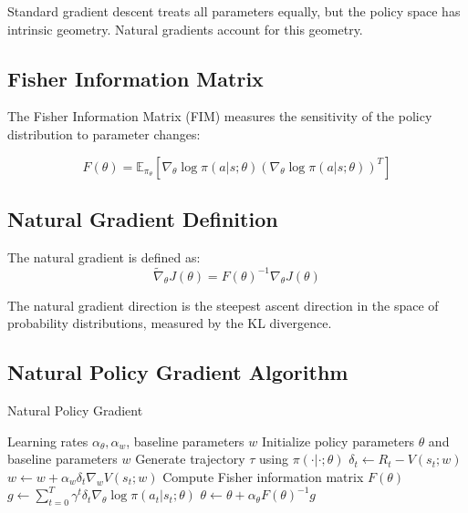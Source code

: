 Standard gradient descent treats all parameters equally, but the policy space has intrinsic geometry. Natural gradients account for this geometry.

\subsection{Fisher Information Matrix}

The Fisher Information Matrix (FIM) measures the sensitivity of the policy distribution to parameter changes:

\begin{equation}
F(\theta) = \mathbb{E}_{\pi_\theta} \left[ \nabla_\theta \log \pi(a|s; \theta) (\nabla_\theta \log \pi(a|s; \theta))^T \right]
\end{equation}

\subsection{Natural Gradient Definition}

The natural gradient is defined as:
\begin{equation}
\tilde{\nabla}_\theta J(\theta) = F(\theta)^{-1} \nabla_\theta J(\theta)
\end{equation}

\begin{theorem}
The natural gradient direction is the steepest ascent direction in the space of probability distributions, measured by the KL divergence.
\end{theorem}

\subsection{Natural Policy Gradient Algorithm}

\begin{algorithm}
\caption{Natural Policy Gradient}
\begin{algorithmic}
\REQUIRE Learning rates $\alpha_\theta, \alpha_w$, baseline parameters $w$
\STATE Initialize policy parameters $\theta$ and baseline parameters $w$
    \STATE Generate trajectory $\tau$ using $\pi(\cdot|\cdot; \theta)$
        \STATE $\delta_t \leftarrow R_t - V(s_t; w)$ 
        \STATE $w \leftarrow w + \alpha_w \delta_t \nabla_w V(s_t; w)$ 
    \ENDFOR
    \STATE Compute Fisher information matrix $F(\theta)$
    \STATE $g \leftarrow \sum_{t=0}^T \gamma^t \delta_t \nabla_\theta \log \pi(a_t|s_t; \theta)$ 
    \STATE $\theta \leftarrow \theta + \alpha_\theta F(\theta)^{-1} g$ 
\ENDFOR
\end{algorithmic}
\end{algorithm}

